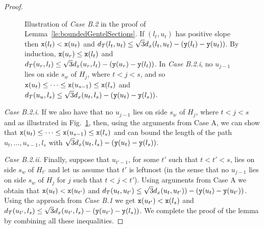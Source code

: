 \begin{proof}
\begin{figure}
\center{\othercase}

\caption{Illustration of {\em Case B.2} in the proof of 
Lemma~\ref{le:boundedGentelSections}. If $(l_t,u_t)$ has positive slope then
${\tt x}(l_t) < {\tt x}(u_t)$ and 
$d_T(l_t,u_t) \leq \sqrt{3}d_x(l_t,u_t)-({\tt y}(l_t)-{\tt y}(u_t))$.
By induction, ${\tt x}(u_r) \leq {\tt x}(l_t)$ and 
$d_T(u_r,l_t) \leq \sqrt{3}d_x(u_r,l_t)-({\tt y}(u_r)-{\tt y}(l_t))$. In
{\em Case B.2.i}, no $u_{j-1}$ lies on side $s_w$ of $H_j$, where $t<j<s$, and so
${\tt x}(u_t) \leq \dots \leq {\tt x}(u_{s-1}) \leq {\tt x}(l_s)$ and 
$d_T(u_u,l_s) \leq \sqrt{3}d_x(u_t,l_s)-({\tt y}(u_t)-{\tt y}(l_s))$.}
\label{fig:othercase}
\end{figure}





{\em Case B.2.i.} If we also have that no $u_{j-1}$ lies on side $s_w$ of $H_j$,
where $t<j<s$ and as illustrated in Fig.~\ref{fig:othercase}, 
then, using the arguments from Case A, we can show that
${\tt x}(u_t) \leq \dots \leq {\tt x}(u_{s-1}) \leq {\tt x}(l_s)$ and 
can bound the length of the path $u_t, \dots, u_{s-1}, l_s$ with 
$\sqrt{3}d_x(u_t,l_s)-({\tt y}(u_t)-{\tt y}(l_s))$. 


{\em Case B.2.ii.} Finally, suppose that $u_{t'-1}$, for some $t'$ such that
$t < t' < s$, lies on side $s_w$ of $H_{t'}$ and let us assume that $t'$ is
leftmost (in the sense that no $u_{j-1}$ lies on side $s_w$ of $H_j$ for $j$
such that $t < j < t'$). Using arguments from Case A we obtain that 
${\tt x}(u_t) < {\tt x}(u_{t'})$ and 
$d_T(u_t, u_{t'}) \leq \sqrt{3}d_x(u_t, u_{t'})) - ({\tt y}(u_t) -
{\tt y}(u_{t'} ))$. Using the approach from {\em Case B.1} we get
${\tt x}(u_{t'}) < {\tt x}(l_s)$ and 
$d_T(u_{t'}, l_s) \leq \sqrt{3}d_x(u_{t'}, l_s) - ({\tt y}(u_{t'})-{\tt y}(l_s))$.
We complete the proof of the lemma by combining all these inequalities.
\end{proof}

